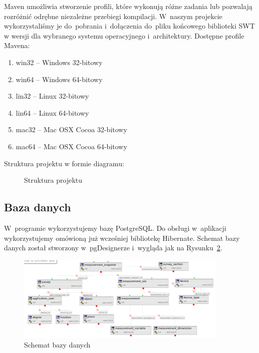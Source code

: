 \newpage
Maven umożliwia stworzenie profili, które wykonują różne zadania lub pozwalają rozróżnić odrębne niezależne przebiegi kompilacji. W~naszym projekcie wykorzystaliśmy je do~pobrania i~dołączenia do~pliku końcowego biblioteki SWT w wersji dla wybranego systemu operacyjnego i~architektury. Dostępne profile Mavena:
\begin{enumerate}
\item win32 -- Windows 32-bitowy
\item win64 -- Windows 64-bitowy 
\item lin32 -- Linux 32-bitowy
\item lin64 -- Linux 64-bitowy
\item mac32 -- Mac OSX Cocoa 32-bitowy
\item mac64 -- Mac OSX Cocoa 64-bitowy
\end{enumerate}

Struktura projektu w formie diagramu:
\begin{figure}[!htb] 	
\centering 	
{}
\caption{Struktura projektu} 
\label{projectSchema}
 \end{figure}

\subsection{Baza danych}
W~programie wykorzystujemy bazę PostgreSQL. Do obsługi w~aplikacji wykorzystujemy omówioną już wcześniej bibliotekę Hibernate. Schemat bazy danych został stworzony w~pgDesignerze i~wygląda jak na Rysunku~\ref{databaseSchema}.
\begin{figure}[!htb] 	
\centering 	
\includegraphics[width=0.9\textwidth]{images/database} 
\caption{Schemat bazy danych} 
\label{databaseSchema}
 \end{figure}